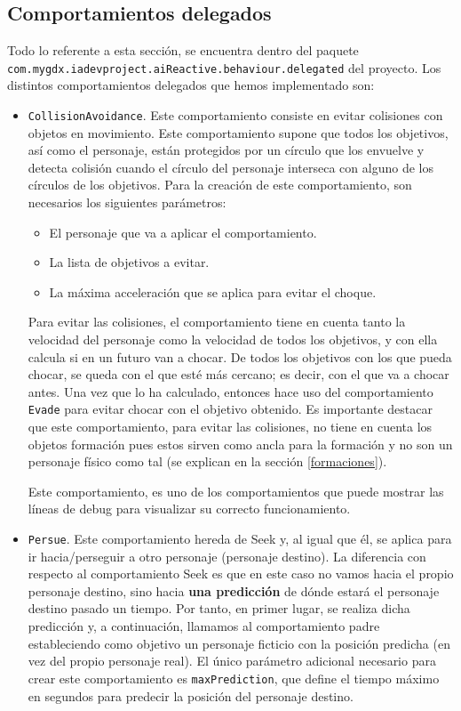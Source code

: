 \medskip
\subsection{Comportamientos delegados}
Todo lo referente a esta sección, se encuentra dentro del paquete \\ \texttt{com.mygdx.iadevproject.aiReactive.behaviour.delegated} del proyecto. Los distintos comportamientos delegados que hemos implementado son:
\begin{itemize}
 \item \texttt{CollisionAvoidance}. Este comportamiento consiste en evitar colisiones con objetos en movimiento. Este comportamiento supone que todos los objetivos, así como el personaje, están protegidos por un círculo que los envuelve y detecta colisión cuando el círculo del personaje interseca con alguno de los círculos de los objetivos. Para la creación de este comportamiento, son necesarios los siguientes parámetros:
 \begin{itemize}
  \item El personaje que va a aplicar el comportamiento.
  \item La lista de objetivos a evitar.
  \item La máxima acceleración que se aplica para evitar el choque.
 \end{itemize}
 Para evitar las colisiones, el comportamiento tiene en cuenta tanto la velocidad del personaje como la velocidad de todos los objetivos, y con ella calcula si en un futuro van a chocar. De todos los objetivos con los que pueda chocar, se queda con el que esté más cercano; es decir, con el que va a chocar antes. Una vez que lo ha calculado, entonces hace uso del comportamiento \texttt{Evade} para evitar chocar con el objetivo obtenido. Es importante destacar que este comportamiento, para evitar las colisiones, no tiene en cuenta los objetos formación pues estos sirven como ancla para la formación y no son un personaje físico como tal (se explican en la sección \ref{formaciones}).
 
 Este comportamiento, es uno de los comportamientos que puede mostrar las líneas de debug para visualizar su correcto funcionamiento. 
 
 \item \texttt{Persue}. Este comportamiento hereda de Seek y, al igual que él, se aplica para ir hacia/perseguir a otro personaje (personaje destino). La diferencia con respecto al comportamiento Seek es que en este caso no vamos hacia el propio personaje destino, sino hacia \textbf{una predicción} de dónde estará el personaje destino pasado un tiempo. Por tanto, en primer lugar, se realiza dicha predicción y, a continuación, llamamos al comportamiento padre estableciendo como objetivo un personaje ficticio con la posición predicha (en vez del propio personaje real). El único parámetro adicional necesario para crear este comportamiento es \texttt{maxPrediction}, que define el tiempo máximo en segundos para predecir la posición del personaje destino.
  

\end{itemize}
